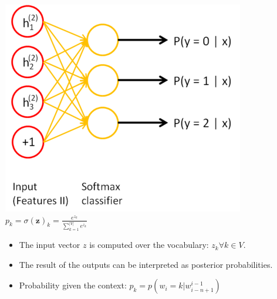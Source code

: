 \documentclass[11pt, a4paper, landscape]{article}
\begin{document}
\vfill
\begin{minipage}[b]{.4\linewidth}
  \begin{center}
    \includegraphics[width=\linewidth]{../article/img/softmax_layer}\\
    $p_k = \sigma(\mathbf{z})_k = \frac{e^{z_k}}{\sum_{k=1}^{|V|} e^{z_k}}$
  \end{center}
\end{minipage}
\begin{minipage}[b]{.6\linewidth}
  \begin{itemize}
  \item The input vector $z$ is computed over the vocabulary: $z_k \forall k \in V$.
  \item The result of the outputs can be interpreted as posterior probabilities.
  \item Probability given the context: $p_k = p(w_i = k | w_{i-n+1}^{i-1})$
  \end{itemize}
\end{minipage}
\vfill

\NewPage{}
\end{document}

